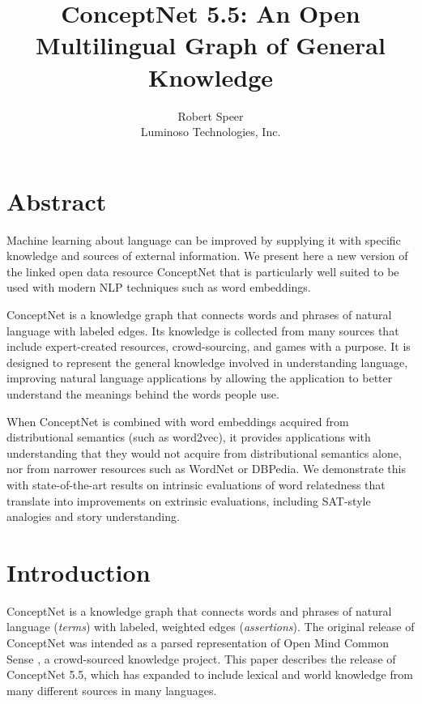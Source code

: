 \documentclass[letterpaper]{article}
\begin{document}
\title{ConceptNet 5.5: An Open Multilingual Graph of General Knowledge}
\author{Robert Speer\\ Luminoso Technologies, Inc.}

\maketitle


\section{Abstract}\label{abstract}

Machine learning about language can be improved by supplying it with specific
knowledge and sources of external information. We present here a new version
of the linked open data resource ConceptNet that is particularly well suited
to be used with modern NLP techniques such as word embeddings.

ConceptNet is a knowledge graph that connects words and phrases of natural
language with labeled edges. Its knowledge is collected from many sources that
include expert-created resources, crowd-sourcing, and games with a purpose. It
is designed to represent the general knowledge involved in understanding
language, improving natural language applications by allowing the application
to better understand the meanings behind the words people use.

When ConceptNet is combined with word embeddings acquired from distributional
semantics (such as word2vec), it provides applications with understanding that
they would not acquire from distributional semantics alone, nor from narrower
resources such as WordNet or DBPedia. We demonstrate this with state-of-the-art
results on intrinsic evaluations of word relatedness that translate into
improvements on extrinsic evaluations, including SAT-style analogies and story
understanding.


\section{Introduction}\label{introduction}

ConceptNet is a knowledge graph that connects words and phrases of
natural language (\emph{terms}) with labeled, weighted edges
(\emph{assertions}). The original release of ConceptNet \cite{liu2004conceptnet}
was intended as a parsed representation of Open Mind Common Sense
\cite{singh2002omcs}, a crowd-sourced knowledge project. This paper
describes the release of ConceptNet 5.5, which has expanded to include
lexical and world knowledge from many different sources in many
languages.
\end{document}
